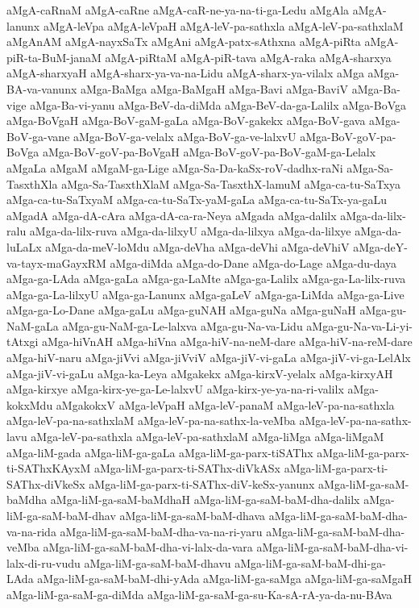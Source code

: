 {aMgA-caRnaM
aMgA-caRne
aMgA-caR-ne-ya-na-ti-ga-Ledu
aMgAla
aMgA-lanunx
aMgA-leVpa
aMgA-leVpaH
aMgA-leV-pa-sathxla
aMgA-leV-pa-sathxlaM
aMgAnAM
aMgA-nayxSaTx
aMgAni
aMgA-patx-sAthxna
aMgA-piRta
aMgA-piR-ta-BuM-janaM
aMgA-piRtaM
aMgA-piR-tava
aMgA-raka
aMgA-sharxya
aMgA-sharxyaH
aMgA-sharx-ya-va-na-Lidu
aMgA-sharx-ya-vilalx
aMga
aMga-BA-va-vanunx
aMga-BaMga
aMga-BaMgaH
aMga-Bavi
aMga-BaviV
aMga-Ba-vige
aMga-Ba-vi-yanu
aMga-BeV-da-diMda
aMga-BeV-da-ga-Lalilx
aMga-BoVga
aMga-BoVgaH
aMga-BoV-gaM-gaLa
aMga-BoV-gakekx
aMga-BoV-gava
aMga-BoV-ga-vane
aMga-BoV-ga-velalx
aMga-BoV-ga-ve-lalxvU
aMga-BoV-goV-pa-BoVga
aMga-BoV-goV-pa-BoVgaH
aMga-BoV-goV-pa-BoV-gaM-ga-Lelalx
aMgaLa
aMgaM
aMgaM-ga-Lige
aMga-Sa-Da-kaSx-roV-dadhx-raNi
aMga-Sa-TasxthXla
aMga-Sa-TasxthXlaM
aMga-Sa-TasxthX-lamuM
aMga-ca-tu-SaTxya
aMga-ca-tu-SaTxyaM
aMga-ca-tu-SaTx-yaM-gaLa
aMga-ca-tu-SaTx-ya-gaLu
aMgadA
aMga-dA-cAra
aMga-dA-ca-ra-Neya
aMgada
aMga-dalilx
aMga-da-lilx-ralu
aMga-da-lilx-ruva
aMga-da-lilxyU
aMga-da-lilxya
aMga-da-lilxye
aMga-da-luLaLx
aMga-da-meV-loMdu
aMga-deVha
aMga-deVhi
aMga-deVhiV
aMga-deY-va-tayx-maGayxRM
aMga-diMda
aMga-do-Dane
aMga-do-Lage
aMga-du-daya
aMga-ga-LAda
aMga-gaLa
aMga-ga-LaMte
aMga-ga-Lalilx
aMga-ga-La-lilx-ruva
aMga-ga-La-lilxyU
aMga-ga-Lanunx
aMga-gaLeV
aMga-ga-LiMda
aMga-ga-Live
aMga-ga-Lo-Dane
aMga-gaLu
aMga-guNAH
aMga-guNa
aMga-guNaH
aMga-gu-NaM-gaLa
aMga-gu-NaM-ga-Le-lalxva
aMga-gu-Na-va-Lidu
aMga-gu-Na-va-Li-yi-tAtxgi
aMga-hiVnAH
aMga-hiVna
aMga-hiV-na-neM-dare
aMga-hiV-na-reM-dare
aMga-hiV-naru
aMga-jiVvi
aMga-jiVviV
aMga-jiV-vi-gaLa
aMga-jiV-vi-ga-LelAlx
aMga-jiV-vi-gaLu
aMga-ka-Leya
aMgakekx
aMga-kirxV-yelalx
aMga-kirxyAH
aMga-kirxye
aMga-kirx-ye-ga-Le-lalxvU
aMga-kirx-ye-ya-na-ri-valilx
aMga-kokxMdu
aMgakokxV
aMga-leVpaH
aMga-leV-panaM
aMga-leV-pa-na-sathxla
aMga-leV-pa-na-sathxlaM
aMga-leV-pa-na-sathx-la-veMba
aMga-leV-pa-na-sathx-lavu
aMga-leV-pa-sathxla
aMga-leV-pa-sathxlaM
aMga-liMga
aMga-liMgaM
aMga-liM-gada
aMga-liM-ga-gaLa
aMga-liM-ga-parx-tiSAThx
aMga-liM-ga-parx-ti-SAThxKAyxM
aMga-liM-ga-parx-ti-SAThx-diVkASx
aMga-liM-ga-parx-ti-SAThx-diVkeSx
aMga-liM-ga-parx-ti-SAThx-diV-keSx-yanunx
aMga-liM-ga-saM-baMdha
aMga-liM-ga-saM-baMdhaH
aMga-liM-ga-saM-baM-dha-dalilx
aMga-liM-ga-saM-baM-dhav
aMga-liM-ga-saM-baM-dhava
aMga-liM-ga-saM-baM-dha-va-na-rida
aMga-liM-ga-saM-baM-dha-va-na-ri-yaru
aMga-liM-ga-saM-baM-dha-veMba
aMga-liM-ga-saM-baM-dha-vi-lalx-da-vara
aMga-liM-ga-saM-baM-dha-vi-lalx-di-ru-vudu
aMga-liM-ga-saM-baM-dhavu
aMga-liM-ga-saM-baM-dhi-ga-LAda
aMga-liM-ga-saM-baM-dhi-yAda
aMga-liM-ga-saMga
aMga-liM-ga-saMgaH
aMga-liM-ga-saM-ga-diMda
aMga-liM-ga-saM-ga-su-Ka-sA-rA-ya-da-nu-BAva
}
